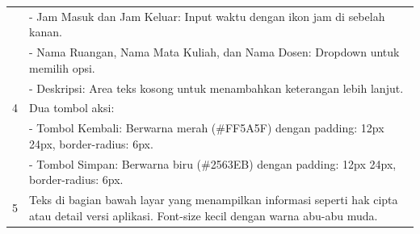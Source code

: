 \begin{enumerate}
\begin{table}[H]
\begin{tabular}{|c|p{}|}
			                              & - Jam Masuk dan Jam Keluar: Input waktu dengan ikon jam di sebelah kanan.                                                                                     \\
			                              & - Nama Ruangan, Nama Mata Kuliah, dan Nama Dosen: Dropdown untuk memilih opsi.                                                                                \\
			                              & - Deskripsi: Area teks kosong untuk menambahkan keterangan lebih lanjut.                                                                                      \\
			      4                       & Dua tombol aksi:                                                                                                                                              \\
			                              & - Tombol Kembali: Berwarna merah (\#FF5A5F) dengan padding: 12px 24px, border-radius: 6px.                                                                    \\
			                              & - Tombol Simpan: Berwarna biru (\#2563EB) dengan padding: 12px 24px, border-radius: 6px.                                                                      \\
			      5                       & Teks di bagian bawah layar yang menampilkan informasi seperti hak cipta atau detail versi aplikasi. Font-size kecil dengan warna abu-abu muda.                \\
			      \hline
		      \end{tabular}
	      \end{table}


\end{enumerate}

